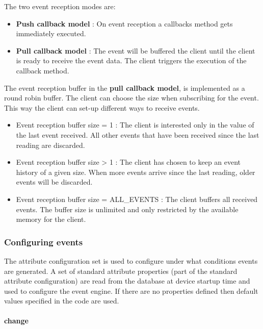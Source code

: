 The two event reception modes are:
\begin{itemize}
\item \textbf{Push callback model} : On event reception a callbacks method
gets immediately executed.
\item \textbf{Pull callback model} : The event will be buffered the client
until the client is ready to receive the event data. The client triggers
the execution of the callback method.
\end{itemize}
The event reception buffer in the \textbf{pull callback model}, is
implemented as a round robin buffer. The client can choose the size
when subscribing for the event. This way the client can set-up different
ways to receive events.
\begin{itemize}
\item Event reception buffer size = 1 : The client is interested only in
the value of the last event received. All other events that have been
received since the last reading are discarded.
\item Event reception buffer size > 1 : The client has chosen to keep an
event history of a given size. When more events arrive since the last
reading, older events will be discarded.
\item Event reception buffer size = ALL\_EVENTS : The client buffers all
received events. The buffer size is unlimited and only restricted
by the available memory for the client.
\end{itemize}

\subsubsection{Configuring events}

The attribute configuration set is used to configure under what conditions
events are generated. A set of standard attribute properties
(part of the standard attribute configuration) are read from the database
at device startup time and used to configure the event engine. If
there are no properties defined then default values specified in the
code are used. 


\paragraph{change}

